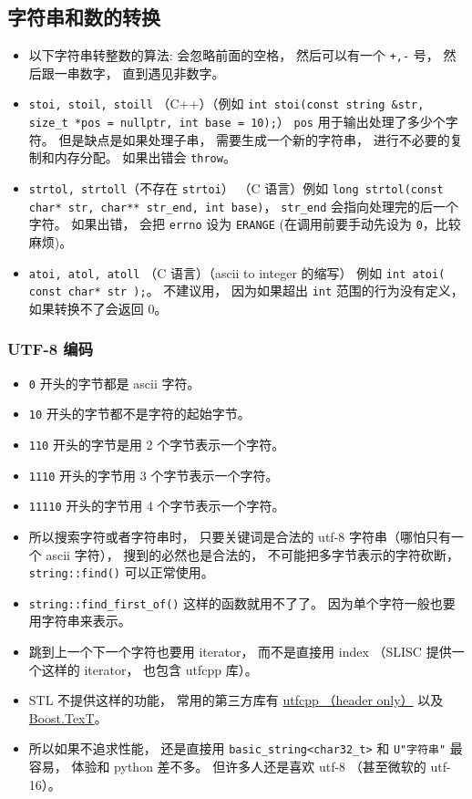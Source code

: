 \subsection{字符串和数的转换}
\begin{itemize}
\item 以下字符串转整数的算法: 会忽略前面的空格， 然后可以有一个 \verb|+,-| 号， 然后跟一串数字， 直到遇见非数字。
\item \verb|stoi, stoil, stoill| （C++）（例如 \verb|int stoi(const string &str, size_t *pos = nullptr, int base = 10);|） \verb|pos| 用于输出处理了多少个字符。 但是缺点是如果处理子串， 需要生成一个新的字符串， 进行不必要的复制和内存分配。 如果出错会 \verb|throw|。
\item \verb|strtol, strtoll|（不存在 \verb|strtoi|） （C 语言）例如 \verb|long strtol(const char* str, char** str_end, int base)|， \verb|str_end| 会指向处理完的后一个字符。 如果出错， 会把 \verb|errno| 设为 \verb|ERANGE| (在调用前要手动先设为 \verb|0|，比较麻烦)。
\item \verb|atoi, atol, atoll| （C 语言）（ascii to integer 的缩写） 例如 \verb|int atoi( const char* str );|。 不建议用， 因为如果超出 \verb|int| 范围的行为没有定义， 如果转换不了会返回 0。
\end{itemize}


\subsubsection{UTF-8 编码}
\begin{itemize}
\item \verb|0| 开头的字节都是 ascii 字符。
\item \verb|10| 开头的字节都不是字符的起始字节。
\item \verb|110| 开头的字节是用 2 个字节表示一个字符。
\item \verb|1110| 开头的字节用 3 个字节表示一个字符。
\item \verb|11110| 开头的字节用 4 个字节表示一个字符。
\item 所以搜索字符或者字符串时， 只要关键词是合法的 utf-8 字符串（哪怕只有一个 ascii 字符）， 搜到的必然也是合法的， 不可能把多字节表示的字符砍断， \verb|string::find()| 可以正常使用。
\item \verb|string::find_first_of()| 这样的函数就用不了了。 因为单个字符一般也要用字符串来表示。
\item 跳到上一个下一个字符也要用 iterator， 而不是直接用 index （SLISC 提供一个这样的 iterator， 也包含 utfcpp 库）。
\item STL 不提供这样的功能， 常用的第三方库有 \href{https://github.com/nemtrif/utfcpp}{utfcpp （header only）} 以及 \href{https://tzlaine.github.io/text/doc/html/index.html}{Boost.TexT}。
\item 所以如果不追求性能， 还是直接用 \verb|basic_string<char32_t>| 和 \verb|U"字符串"| 最容易， 体验和 python 差不多。 但许多人还是喜欢 utf-8 （甚至微软的 utf-16）。
\end{itemize}


